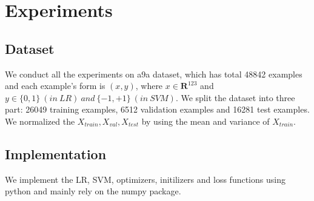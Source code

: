 \documentclass[journal, a4paper]{IEEEtran}
\begin{document}
\section{Experiments}
\subsection{Dataset}
We conduct all the experiments on a9a dataset, which has total 48842 examples and each example's form is $(x, y)$, where $x \in \mathbf{R}^{123}$ and $y \in \{0, 1\}~(in~LR)~and~\{-1, +1\}~(in~SVM)$. We split the dataset into three part: 26049 training examples, 6512 validation examples and 16281 test examples. We normalized the $X_{train}, X_{val}, X_{test} $ by using the mean and variance of $X_{train}$.

\subsection{Implementation}
We implement the LR, SVM, optimizers, initilizers and loss functions using python and mainly rely on the numpy package.
\end{document}
